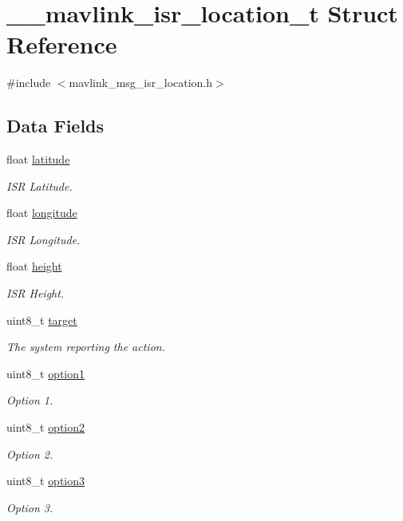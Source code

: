 \hypertarget{struct____mavlink__isr__location__t}{\section{\+\_\+\+\_\+mavlink\+\_\+isr\+\_\+location\+\_\+t Struct Reference}
\label{struct____mavlink__isr__location__t}
}


{\ttfamily \#include $<$mavlink\+\_\+msg\+\_\+isr\+\_\+location.\+h$>$}

\subsection*{Data Fields}
\begin{DoxyCompactItemize}
\item 
float \hyperlink{struct____mavlink__isr__location__t_ad8dad07c3383d1ca918a8a060a1ff1bb}{latitude}
\begin{DoxyCompactList}\small\item\em I\+S\+R Latitude. \end{DoxyCompactList}\item 
float \hyperlink{struct____mavlink__isr__location__t_aaac5099bf28d3f328e0e319ec242b312}{longitude}
\begin{DoxyCompactList}\small\item\em I\+S\+R Longitude. \end{DoxyCompactList}\item 
float \hyperlink{struct____mavlink__isr__location__t_ab250cc8e7f75a35eb90ea414ad32e45f}{height}
\begin{DoxyCompactList}\small\item\em I\+S\+R Height. \end{DoxyCompactList}\item 
uint8\+\_\+t \hyperlink{struct____mavlink__isr__location__t_a497d9090eb860ec7b2e1871f0e452a77}{target}
\begin{DoxyCompactList}\small\item\em The system reporting the action. \end{DoxyCompactList}\item 
uint8\+\_\+t \hyperlink{struct____mavlink__isr__location__t_a89a81bb67aec9c999a150b2b45dd9090}{option1}
\begin{DoxyCompactList}\small\item\em Option 1. \end{DoxyCompactList}\item 
uint8\+\_\+t \hyperlink{struct____mavlink__isr__location__t_abd0a0be1e0f63d9a08f02df446f726dc}{option2}
\begin{DoxyCompactList}\small\item\em Option 2. \end{DoxyCompactList}\item 
uint8\+\_\+t \hyperlink{struct____mavlink__isr__location__t_ac4ad50b049db3a39b9902147efe67d78}{option3}
\begin{DoxyCompactList}\small\item\em Option 3. \end{DoxyCompactList}\end{DoxyCompactItemize}


